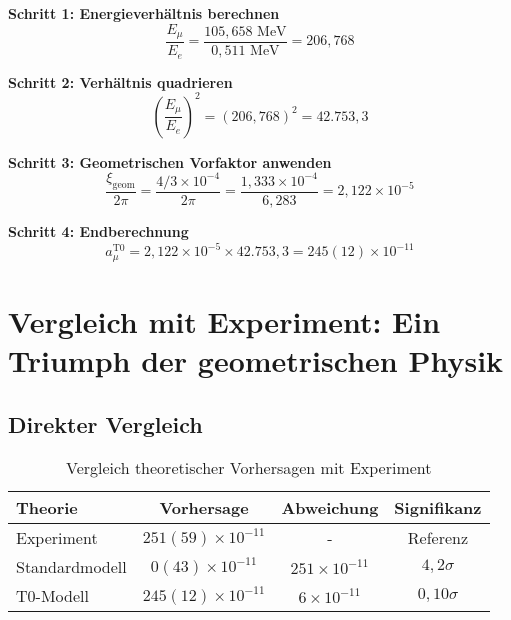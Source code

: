 \documentclass[12pt,a4paper]{report}
\newcommand{\xigeom}{\xi_{\text{geom}}}   %
\newcommand{\Ee}{E_e}                     %
\newcommand{\Emu}{E_\mu}                  %
\begin{document}
\textbf{Schritt 1: Energieverhältnis berechnen}
\begin{equation}
	\frac{\Emu}{\Ee} = \frac{105,658 \text{ MeV}}{0,511 \text{ MeV}} = 206,768
	\label{eq:energy_ratio}
\end{equation}

\textbf{Schritt 2: Verhältnis quadrieren}
\begin{equation}
	\left(\frac{\Emu}{\Ee}\right)^2 = (206,768)^2 = 42.753,3
	\label{eq:energy_ratio_squared}
\end{equation}

\textbf{Schritt 3: Geometrischen Vorfaktor anwenden}
\begin{equation}
	\frac{\xigeom}{2\pi} = \frac{4/3 \times 10^{-4}}{2\pi} = \frac{1,333 \times 10^{-4}}{6,283} = 2,122 \times 10^{-5}
	\label{eq:geometric_prefactor}
\end{equation}

\textbf{Schritt 4: Endberechnung}
\begin{equation}
	a_\mu^{\text{T0}} = 2,122 \times 10^{-5} \times 42.753,3 = 245(12) \times 10^{-11}
	\label{eq:t0_final}
\end{equation}

\section{Vergleich mit Experiment: Ein Triumph der geometrischen Physik}
\label{sec:comparison_experiment}

\subsection{Direkter Vergleich}
\label{subsec:direct_comparison}

\begin{table}[H]
	\centering
	\caption{Vergleich theoretischer Vorhersagen mit Experiment}
	\begin{tabular}{@{}lccc@{}}
		\toprule
		\textbf{Theorie} & \textbf{Vorhersage} & \textbf{Abweichung} & \textbf{Signifikanz} \\
		\midrule
		Experiment & $251(59) \times 10^{-11}$ & - & Referenz \\
		Standardmodell & $0(43) \times 10^{-11}$ & $251 \times 10^{-11}$ & $4,2\sigma$ \\
		T0-Modell & $245(12) \times 10^{-11}$ & $6 \times 10^{-11}$ & $0,10\sigma$ \\
		\bottomrule
	\end{tabular}
\end{table}
\end{document}
